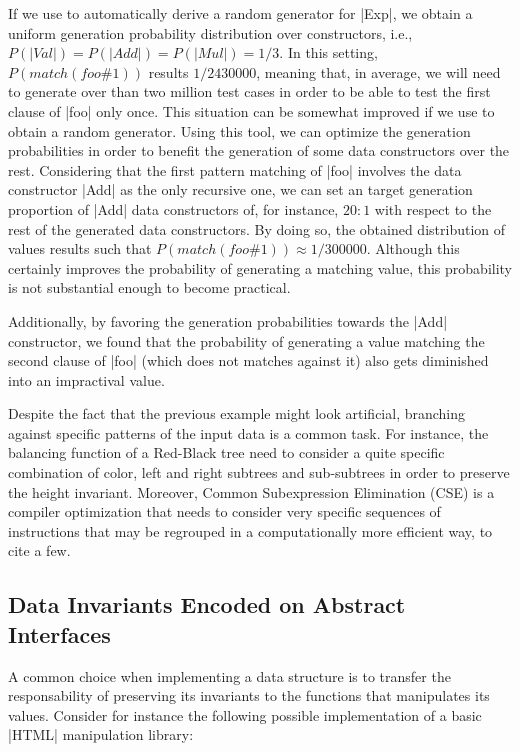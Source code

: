 If we use \megadeth to automatically derive a random generator for |Exp|, we
obtain a uniform generation probability distribution over constructors, i.e.,
$P(|Val|) = P(|Add|) = P(|Mul|) = 1/3$.
%
In this setting, $P(match(foo\#1))$ results $1/2430000$, meaning that, in
average, we will need to generate over than two million test cases in order to
be able to test the first clause of |foo| only once.
%
This situation can be somewhat improved if we use \dragen to obtain a random
generator.
%
Using this tool, we can optimize the generation probabilities in order to
benefit the generation of some data constructors over the rest.
%
Considering that the first pattern matching of |foo| involves the data
constructor |Add| as the only recursive one, we can set an target generation
proportion of |Add| data constructors of, for instance, $20:1$ with respect to
the rest of the generated data constructors.
%
By doing so, the obtained distribution of values results such that
$P(match(foo\#1)) \approx 1/300000$.
%
Although this certainly improves the probability of generating a matching value,
this probability is not substantial enough to become practical.


Additionally, by favoring the generation probabilities towards the |Add|
constructor, we found that the probability of generating a value matching the
second clause of |foo| (which does not matches against it) also gets diminished
into an impractival value.


Despite the fact that the previous example might look artificial, branching
against specific patterns of the input data is a common task.
%
For instance, the balancing function of a Red-Black tree need to consider a
quite specific combination of color, left and right subtrees and sub-subtrees
in order to preserve the height invariant.
%
Moreover, Common Subexpression Elimination (CSE) is a compiler optimization that
needs to consider very specific sequences of instructions that may be regrouped
in a computationally more efficient way, to cite a few.



\subsection{\textbf{Data Invariants Encoded on Abstract Interfaces}}

A common choice when implementing a data structure is to transfer the
responsability of preserving its invariants to the functions that manipulates
its values.
%
Consider for instance the following possible implementation of a basic |HTML|
manipulation library:

